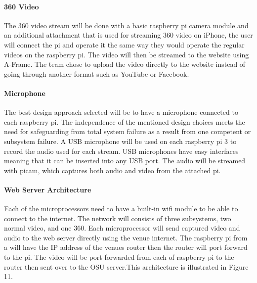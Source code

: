 \documentclass[onecolumn, draftclsnofoot,10pt, compsoc]{IEEEtran}
\begin{document}
        \paragraph{360 Video}
        The 360 video stream will be done with a basic raspberry pi camera module and an additional attachment that is used for streaming 360 video on iPhone, the user will connect the pi and operate it the same way they would operate the regular videos on the raspberry pi.
        The video will then be streamed to the website using A-Frame.
        The team chose to upload the video directly to the website instead of going through another format such as YouTube or Facebook.
        
        \paragraph{Microphone}
        The best design approach selected will be to have a microphone connected to each raspberry pi.  
        The independence of the mentioned design choices meets the need for safeguarding from total system failure as a result from one competent or subsystem failure.
        A USB microphone will be used on each raspberry pi 3 to record the audio used for each stream. 
        USB microphones have easy interfaces meaning that it can be inserted into any USB port. 
        The audio will be streamed with picam, which captures both audio and video from the attached pi. 

        
        \paragraph{Web Server Architecture}
        Each of the microprocessors need to have a built-in wifi module to be able to connect to the internet. 
        The network will consists of three subsystems, two normal video, and one 360. 
        Each microprocessor will send captured video and audio to the web server directly using the venue internet. 
        The raspberry pi from a will have the IP address of the venues router then the router will port forward to the pi. The video will be port forwarded from each of raspberry pi to the router then sent over to the OSU server.This architecture is illustrated in Figure 11.
\end{document}
